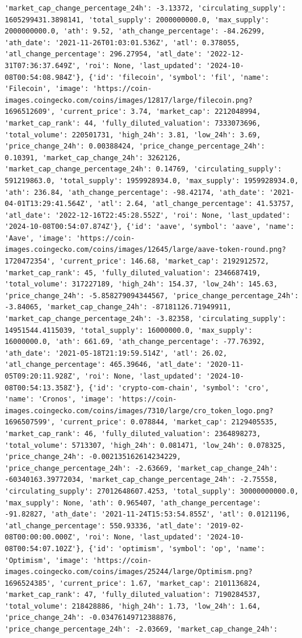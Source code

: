 \documentclass[
  letterpaper,
  DIV=11,
  numbers=noendperiod]{scrreprt}
\begin{document}
\begin{verbatim}
'market_cap_change_percentage_24h': -3.13372, 'circulating_supply': 1605299431.3898141, 'total_supply': 2000000000.0, 'max_supply': 2000000000.0, 'ath': 9.52, 'ath_change_percentage': -84.26299, 'ath_date': '2021-11-26T01:03:01.536Z', 'atl': 0.378055, 'atl_change_percentage': 296.27954, 'atl_date': '2022-12-31T07:36:37.649Z', 'roi': None, 'last_updated': '2024-10-08T00:54:08.984Z'}, {'id': 'filecoin', 'symbol': 'fil', 'name': 'Filecoin', 'image': 'https://coin-images.coingecko.com/coins/images/12817/large/filecoin.png?1696512609', 'current_price': 3.74, 'market_cap': 2212048994, 'market_cap_rank': 44, 'fully_diluted_valuation': 7333073696, 'total_volume': 220501731, 'high_24h': 3.81, 'low_24h': 3.69, 'price_change_24h': 0.00388424, 'price_change_percentage_24h': 0.10391, 'market_cap_change_24h': 3262126, 'market_cap_change_percentage_24h': 0.14769, 'circulating_supply': 591219863.0, 'total_supply': 1959928934.0, 'max_supply': 1959928934.0, 'ath': 236.84, 'ath_change_percentage': -98.42174, 'ath_date': '2021-04-01T13:29:41.564Z', 'atl': 2.64, 'atl_change_percentage': 41.53757, 'atl_date': '2022-12-16T22:45:28.552Z', 'roi': None, 'last_updated': '2024-10-08T00:54:07.874Z'}, {'id': 'aave', 'symbol': 'aave', 'name': 'Aave', 'image': 'https://coin-images.coingecko.com/coins/images/12645/large/aave-token-round.png?1720472354', 'current_price': 146.68, 'market_cap': 2192912572, 'market_cap_rank': 45, 'fully_diluted_valuation': 2346687419, 'total_volume': 317227189, 'high_24h': 154.37, 'low_24h': 145.63, 'price_change_24h': -5.858279094344567, 'price_change_percentage_24h': -3.84065, 'market_cap_change_24h': -87181126.71949911, 'market_cap_change_percentage_24h': -3.82358, 'circulating_supply': 14951544.4115039, 'total_supply': 16000000.0, 'max_supply': 16000000.0, 'ath': 661.69, 'ath_change_percentage': -77.76392, 'ath_date': '2021-05-18T21:19:59.514Z', 'atl': 26.02, 'atl_change_percentage': 465.39646, 'atl_date': '2020-11-05T09:20:11.928Z', 'roi': None, 'last_updated': '2024-10-08T00:54:13.358Z'}, {'id': 'crypto-com-chain', 'symbol': 'cro', 'name': 'Cronos', 'image': 'https://coin-images.coingecko.com/coins/images/7310/large/cro_token_logo.png?1696507599', 'current_price': 0.078844, 'market_cap': 2129405535, 'market_cap_rank': 46, 'fully_diluted_valuation': 2364898273, 'total_volume': 5713307, 'high_24h': 0.081471, 'low_24h': 0.078325, 'price_change_24h': -0.002135162614234229, 'price_change_percentage_24h': -2.63669, 'market_cap_change_24h': -60340163.39772034, 'market_cap_change_percentage_24h': -2.75558, 'circulating_supply': 27012648607.4253, 'total_supply': 30000000000.0, 'max_supply': None, 'ath': 0.965407, 'ath_change_percentage': -91.82827, 'ath_date': '2021-11-24T15:53:54.855Z', 'atl': 0.0121196, 'atl_change_percentage': 550.93336, 'atl_date': '2019-02-08T00:00:00.000Z', 'roi': None, 'last_updated': '2024-10-08T00:54:07.102Z'}, {'id': 'optimism', 'symbol': 'op', 'name': 'Optimism', 'image': 'https://coin-images.coingecko.com/coins/images/25244/large/Optimism.png?1696524385', 'current_price': 1.67, 'market_cap': 2101136824, 'market_cap_rank': 47, 'fully_diluted_valuation': 7190284537, 'total_volume': 218428886, 'high_24h': 1.73, 'low_24h': 1.64, 'price_change_24h': -0.03476149712388876, 'price_change_percentage_24h': -2.03669, 'market_cap_change_24h': 
\end{verbatim}
\end{document}
